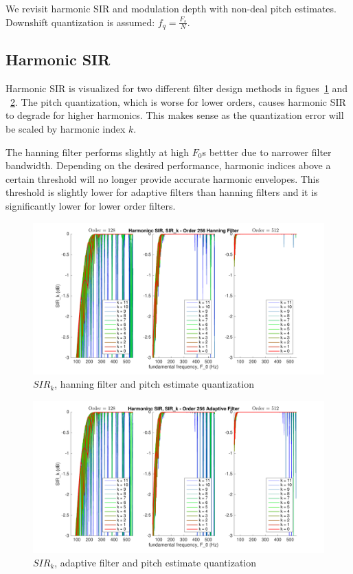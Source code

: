 \documentclass [11pt, proquest] {uwthesis}[2015/03/03]
\begin{document}
We revisit harmonic SIR and modulation depth with non-deal pitch estimates.  Downshift quantization is assumed: $f_q = \frac{F_s}{N}$.

\subsection{Harmonic SIR}

Harmonic SIR is visualized for two different filter design methods in figues~\ref{fig:pitch_sir_k_1} and ~\ref{fig:pitch_sir_k_2}.  The pitch quantization, which is worse for lower orders, causes harmonic SIR to degrade for higher harmonics.  This makes sense as the quantization error will be scaled by harmonic index $k$.

The hanning filter performs slightly at high $F_0$s bettter due to narrower filter bandwidth.  Depending on the desired performance, harmonic indices above a certain threshold will no longer provide accurate harmonic envelopes.  This threshold is slightly lower for adaptive filters than hanning filters and it is significantly lower for lower order filters.

\begin{figure}[!ht]
  \centering
    \includegraphics[width=1\textwidth]{pitch_sir_k_1}
    \caption{$SIR_k$, hanning filter and pitch estimate quantization}\label{fig:pitch_sir_k_1}
\end{figure}

\begin{figure}[!ht]
  \centering
    \includegraphics[width=1\textwidth]{pitch_sir_k_2}
    \caption{$SIR_k$, adaptive filter and pitch estimate quantization}\label{fig:pitch_sir_k_2}
\end{figure}
\end{document}
